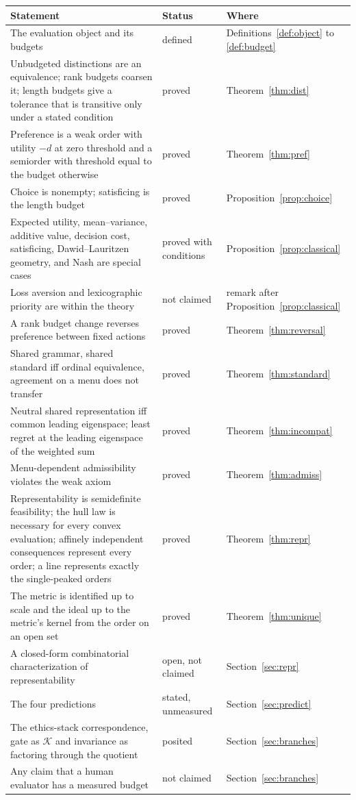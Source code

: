 \documentclass[11pt]{article}
\theoremstyle{definition}
\theoremstyle{remark}
\newcommand{\K}{\mathcal{K}}
\begin{document}
\begin{center}
\small
\begin{tabular}{p{} p{} p{}}
\toprule
Statement & Status & Where \\
\midrule
The evaluation object and its budgets & defined & Definitions~\ref{def:object} to \ref{def:budget} \\
Unbudgeted distinctions are an equivalence; rank budgets coarsen it; length budgets give a tolerance that is transitive only under a stated condition & proved & Theorem~\ref{thm:dist} \\
Preference is a weak order with utility $-d$ at zero threshold and a semiorder with threshold equal to the budget otherwise & proved & Theorem~\ref{thm:pref} \\
Choice is nonempty; satisficing is the length budget & proved & Proposition~\ref{prop:choice} \\
Expected utility, mean--variance, additive value, decision cost, satisficing, Dawid--Lauritzen geometry, and Nash are special cases & proved with conditions & Proposition~\ref{prop:classical} \\
Loss aversion and lexicographic priority are within the theory & not claimed & remark after Proposition~\ref{prop:classical} \\
A rank budget change reverses preference between fixed actions & proved & Theorem~\ref{thm:reversal} \\
Shared grammar, shared standard iff ordinal equivalence, agreement on a menu does not transfer & proved & Theorem~\ref{thm:standard} \\
Neutral shared representation iff common leading eigenspace; least regret at the leading eigenspace of the weighted sum & proved & Theorem~\ref{thm:incompat} \\
Menu-dependent admissibility violates the weak axiom & proved & Theorem~\ref{thm:admiss} \\
Representability is semidefinite feasibility; the hull law is necessary for every convex evaluation; affinely independent consequences represent every order; a line represents exactly the single-peaked orders & proved & Theorem~\ref{thm:repr} \\
The metric is identified up to scale and the ideal up to the metric's kernel from the order on an open set & proved & Theorem~\ref{thm:unique} \\
A closed-form combinatorial characterization of representability & open, not claimed & Section~\ref{sec:repr} \\
The four predictions & stated, unmeasured & Section~\ref{sec:predict} \\
The ethics-stack correspondence, gate as $\K$ and invariance as factoring through the quotient & posited & Section~\ref{sec:branches} \\
Any claim that a human evaluator has a measured budget & not claimed & Section~\ref{sec:branches} \\
\bottomrule
\end{tabular}
\end{center}
\end{document}
